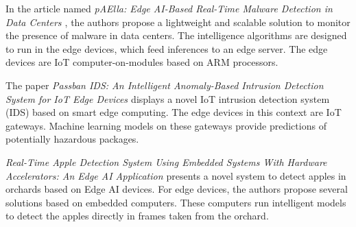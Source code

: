 
In the article named \textit{pAElla: Edge AI-Based Real-Time Malware Detection in Data Centers \cite{libri2020paella}}, the authors propose a lightweight and scalable solution to monitor the presence of malware in data centers. The intelligence algorithms are designed to run in the edge devices, which feed inferences to an edge server. The edge devices are IoT computer-on-modules based on ARM processors.



The paper \textit{Passban IDS: An Intelligent Anomaly-Based Intrusion Detection System for IoT Edge Devices \cite{eskandari2020passban}} displays a novel IoT intrusion detection system (IDS) based on smart edge computing. The edge devices in this context are IoT gateways. Machine learning models on these gateways provide predictions of potentially hazardous packages.



\textit{Real-Time Apple Detection System Using Embedded Systems With Hardware Accelerators: An Edge AI Application \cite{mazzia2020real}} presents a novel system to detect apples in orchards based on Edge AI devices. For edge devices, the authors propose several solutions based on embedded computers. These computers run intelligent models to detect the apples directly in frames taken from the orchard.



